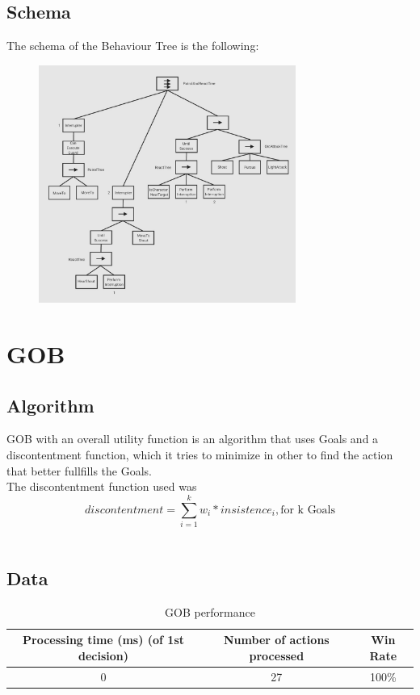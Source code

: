 \documentclass{article}
\begin{document}
  \newpage

  \subsection{Schema}
  The schema of the Behaviour Tree is the following:
  \begin{figure}[h]
    \centering
    \includegraphics[width=0.75\textwidth ]{Schema.jpg}
  \end{figure}
  \section{GOB}
  \subsection{Algorithm}
  GOB with an overall utility function is an algorithm that uses Goals and a discontentment function, which it tries to minimize in other to find the action that better fullfills the Goals. \\
  The discontentment function used was \[discontentment = \sum_{i=1}^{k}w_i * insistence_i, \text{for k Goals}\]\\ 
  \subsection{Data}
  \begin{table}[h!]
    \centering
    \caption{GOB performance}
    \label{tab:tableGOB1}
    \begin{tabular}{c|c|c}
      \textbf{Processing time (ms) (of 1st decision)} & \textbf{Number of actions processed} & \textbf{Win Rate}\\
      \hline
      0 & 27 & 100\%
    \end{tabular}
  \end{table}
\end{document}
